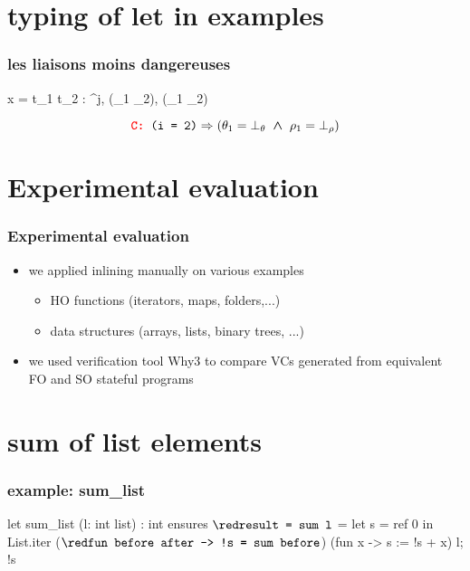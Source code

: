 \documentclass[xcolor=dvipsnames]{beamer}
\newcommand{\bwedge}{\boldsymbol{~\wedge~}}
\newcommand{\bvee}{\boldsymbol{~\vee~}}
\begin{document}
\section*{typing of let in examples}
\begin{frame}[fragile]
\frametitle{les liaisons moins dangereuses}
			{\vspace*{-1em}\hspace*{2.1em}{ \Gamma} \vdash {} x = t_1  t_2 
				: \tau^{j},{\red  
				(\theta_1 \bvee \theta_2)},{\red  
				(\rho_1 \bvee \rho_2)} \phantom{tttttttt}}

\bigskip
$$ \textcolor{red}{\texttt{\textbf{C: }}} \texttt{(i = 2)} \Rightarrow 
			(\theta_1 = \bot_{\theta}\bwedge \rho_1 = \bot_{\rho})$$
\end{frame}
\addtocounter{framenumber}{-1}




\section*{Experimental evaluation}
\begin{frame}
\frametitle{Experimental evaluation}
\begin{itemize}
\item we applied inlining manually on various examples
\begin{itemize}
\item {\red HO functions} (iterators, maps, folders,...)
\item {\red data structures} (arrays, lists, binary trees, ...) \pause \bigskip
\end{itemize}
\item we used {\red verification tool} Why3 to compare VCs generated from  equivalent FO and SO stateful programs
\end{itemize}
\end{frame}

\section*{sum of list elements} 
\begin{frame}[fragile]
\frametitle{example: sum\_list}
\hspace*{-1em}
\begin{whycode}
 let sum_list (l: int list) : int
 ensures { ${\red \texttt{result =  sum l}}$ }
 = let s = ref 0 in
   List.iter 
     (${\red\texttt{fun before after -> !s = sum before}}$) 
     (fun x -> s := !s + x) l; 
   !s     
\end{whycode}
\end{frame}
\end{document}
